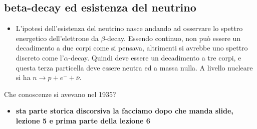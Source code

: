 \subsection{beta-decay ed esistenza del neutrino}
\begin{itemize}
    \item L'ipotesi dell'esistenza del neutrino nasce andando ad osservare lo spettro energetico dell'elettrone da $\beta$-decay. Essendo continuo, non può essere un decadimento a due corpi come si pensava, altrimenti si avrebbe uno spettro discreto come l'$\alpha$-decay. Quindi deve essere un decadimento a tre corpi, e questa terza particella deve essere neutra ed a massa nulla. A livello nucleare si ha $n\to p+e^-+\bar{\nu}$. 
\end{itemize}
Che conoscenze si avevano nel 1935?
\begin{itemize}
    \item \textbf{sta parte storica discorsiva la facciamo dopo che manda slide, lezione 5 e prima parte della lezione 6}
\end{itemize}
